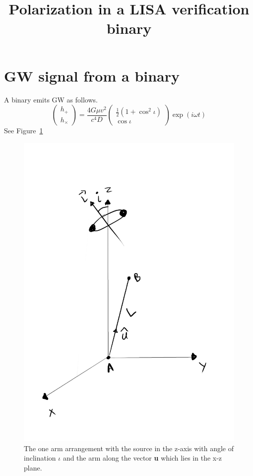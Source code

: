 \documentclass[10pt,a4paper]{article}
\title{Polarization in a LISA verification binary}
\begin{document}
\maketitle

\section*{GW signal from a binary}

A binary emits GW as follows.
\begin{equation}
\begin{pmatrix}
  h_+\\h_\times
\end{pmatrix}
= \frac{4G\mu v^2}{c^4 D}
\begin{pmatrix}
  \frac12(1+\cos^2\iota) \\
  \cos\iota
\end{pmatrix}
\exp(i\omega t)
\end{equation}
See Figure~\ref{fig:binary}

\begin{figure}[h]
\centering
\includegraphics[scale=0.25]{../Figures/diagram1.jpg}
\caption{The one arm arrangement with the source in the z-axis with
  angle of inclination $\iota$ and the arm along the vector \textbf{u}
  which lies in the x-z plane.\label{fig:binary}}
\end{figure}
\end{document}

